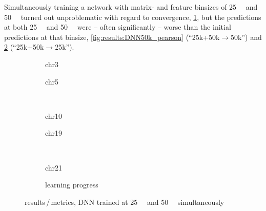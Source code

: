 Simultaneously training a network with matrix- and feature binsizes of \SI{25}{\kilo\bp} and \SI{50}{\kilo\bp}
turned out unproblematic with regard to convergence, \cref{fig:results:25plus50_lossEpochs}, 
but the predictions at both \SI{25}{\kilo\bp} and \SI{50}{\kilo\bp} were -- often significantly -- worse
than the initial predictions at that binsize, \cref{fig:results:DNN50k_pearson} (``25k+50k$\rightarrow$50k'') and \cref{fig:results:DNN25plus50_pearson} (``25k+50k$\rightarrow$25k'').
\begin{figure}[p]
    \begin{subfigure}{0.45\textwidth}
        \scriptsize
        \caption{chr3}
    \end{subfigure} \hfill
    \begin{subfigure}{0.45\textwidth}
        \scriptsize
        \caption{chr5}
    \end{subfigure}\\[5mm]
    \begin{subfigure}{0.45\textwidth}
        \scriptsize
        \caption{chr10}
    \end{subfigure}\hfill
    \begin{subfigure}{0.45\textwidth}
        \scriptsize
        \caption{chr19}
    \end{subfigure}\\[3mm]
    \begin{subfigure}{0.45\textwidth}
        \scriptsize
        \caption{chr21}
    \end{subfigure}\hfill
    \begin{subfigure}{0.45\textwidth}
        \caption{learning progress} \label{fig:results:25plus50_lossEpochs}
    \end{subfigure}
    \caption{results\,/\,metrics, DNN trained at \SI{25}{\kilo\bp} and \SI{50}{\kilo\bp} simultaneously} \label{fig:results:DNN25plus50_pearson}
\end{figure}







